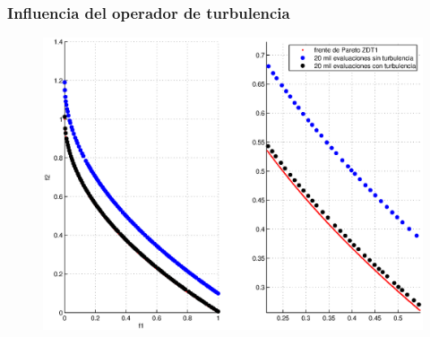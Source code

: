 \documentclass[10pt,compress]{beamer}
\begin{document}
\begin{frame}
	\frametitle{Influencia del operador de turbulencia}	
	\begin{figure}[H]
	\centering
	\includegraphics[scale=0.4]{zdt1turbulencia.eps}
      
      \end{figure}
\end{frame}
\end{document}
